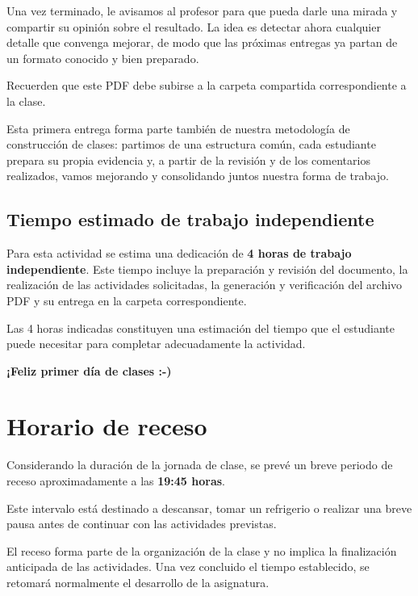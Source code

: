 \documentclass[12pt,a4paper]{article}
\begin{document}
Una vez terminado, le avisamos al profesor para que pueda darle una mirada y compartir su opinión sobre el resultado. La idea es detectar ahora cualquier detalle que convenga mejorar, de modo que las próximas entregas ya partan de un formato conocido y bien preparado.

Recuerden que este PDF debe subirse a la carpeta compartida correspondiente a la clase.

Esta primera entrega forma parte también de nuestra metodología de construcción de clases: partimos de una estructura común, cada estudiante prepara su propia evidencia y, a partir de la revisión y de los comentarios realizados, vamos mejorando y consolidando juntos nuestra forma de trabajo.

\subsection{Tiempo estimado de trabajo independiente}

Para esta actividad se estima una dedicación de
\textbf{4 horas de trabajo independiente}. Este tiempo incluye la
preparación y revisión del documento, la realización de las actividades
solicitadas, la generación y verificación del archivo PDF y su entrega
en la carpeta correspondiente.

Las 4 horas indicadas constituyen una estimación del tiempo que el
estudiante puede necesitar para completar adecuadamente la actividad.

\begin{center}
\Large\textbf{¡Feliz primer día de clases :-)}
\end{center}

\appendix

\section{Horario de receso}

Considerando la duración de la jornada de clase, se prevé un breve periodo
de receso aproximadamente a las \textbf{19:45 horas}.

Este intervalo está destinado a descansar, tomar un refrigerio o realizar
una breve pausa antes de continuar con las actividades previstas.

El receso forma parte de la organización de la clase y no implica la
finalización anticipada de las actividades. Una vez concluido el tiempo
establecido, se retomará normalmente el desarrollo de la asignatura.
\end{document}
